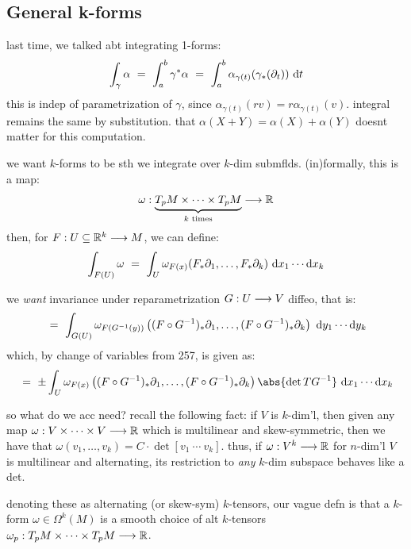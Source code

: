 \subsection{General k-forms}

last time, we talked abt integrating 1-forms:
\begin{equation*}
	\int_{\gamma}\alpha \ = \ \int_{a}^{b}\gamma^{*}\alpha
	\ = \ \int_{a}^{b}\alpha_{\gamma(t)}(\gamma_{*}(\p_{t}))\di t
\end{equation*}
this is indep of parametrization of $\gamma$, since $\alpha_{\gamma(t)}(rv)=r\alpha_{\gamma(t)}(v)$.
integral remains the same by substitution.
that $\alpha(X+Y)=\alpha(X)+\alpha(Y)$ doesnt matter for this computation.

we want $k$-forms to be sth we integrate over $k$-dim submflds.
(in)formally, this is a map:
\begin{equation*}
	\omega:\underbrace{T_{p}M\times \cdots \times T_{p}M}_{k \textrm{ times}}\longrightarrow\mathbb{R}
\end{equation*}
then, for $F:U\subseteq\mathbb{R}^{k}\longrightarrow M$, we can define:
\begin{equation*}
	\int_{F(U)}\omega
	\ = \ \int_{U}\omega_{F(x)}(F_{*}\partial_{1},\dots,F_{*}\partial_{k})
	\textrm{ d} x_{1}\cdots\textrm{d} x_{k}
\end{equation*}

we \textit{want} invariance under reparametrization $G:U\longrightarrow V$ diffeo, that is:
\begin{equation*}
	\ = \ \int_{G(U)}\omega_{F(G^{-1}(y))}
	\left((F\circ G^{-1})_{*}\partial_{1},\dots,(F\circ G^{-1})_{*}\partial_{k}\right)
	\textrm{ d} y_{1}\cdots\textrm{d} y_{k}
\end{equation*}
which, by change of variables from 257, is given as:
\begin{equation*}
	\ = \ \pm\int_{U}\omega_{F(x)}
	\left((F\circ G^{-1})_{*}\p_{1},\dots,(F\circ G^{-1})_{*}\p_{k}\right)
	\abs{\det TG^{-1}}\di x_{1}\cdots\d x_{k}
\end{equation*}

so what do we acc need? recall the following fact: if $V$ is $k$-dim'l, then
given any map $\omega:V\times\cdots\times V\longrightarrow\mathbb{R}$ which is multilinear and
skew-symmetric, then we have that
$\omega(v_{1},\dots,v_{k})=C\cdot\det[v_{1} \ \cdots \ v_{k}]$.
thus, if $\omega:V^{k}\longrightarrow\mathbb{R}$ for $n$-dim'l $V$ is multilinear and alternating,
its restriction to \textit{any} $k$-dim subspace behaves like a det.

denoting these as alternating (or skew-sym) $k$-tensors,
our vague defn is that a $k$-form $\omega\in\Omega^{k}(M)$ is a smooth choice of
alt $k$-tensors $\omega_{p}:T_{p}M\times\cdots\times T_{p}M\longrightarrow\mathbb{R}$.

